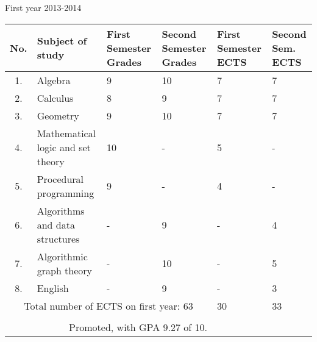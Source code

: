 \documentclass[a4paper,9pt,final]{scrartcl}
\begin{document}
\begin{center}
	First year 2013-2014
	\begin{longtable}{|c|m{6cm}|m{1.5cm}|m{1.5cm}|m{1.5cm}|m{1.5cm}|}
		\hline
		No. & Subject of study & First Semester Grades & Second Semester Grades & First Semester ECTS & Second Sem. ECTS\\
		\hline
		\hline
		1. & Algebra & 9 & 10 & 7 & 7 \\ \hline
		2. & Calculus & 8 & 9 & 7 & 7 \\ \hline
		3. & Geometry & 9 & 10 & 7 & 7 \\ \hline
		4. & Mathematical logic and set theory & 10 & - & 5 & -\\ \hline
		5. & Procedural programming & 9 & - & 4 & - \\ \hline
		6. & Algorithms and data structures & - & 9 & - & 4 \\ \hline
		7. & Algorithmic graph theory & - & 10 & - & 5 \\ \hline 
		8. & English & - & 9 & - & 3 \\ \hline		
		\multicolumn{4}{|c|}{Total number of ECTS on first year: 63} & 30 & 33 \\ \hline 
			\multicolumn{6}{c}{} \\ 
			\multicolumn{4}{r}{Promoted, with GPA 9.27 of 10.}
				
	\end{longtable}

\end{center}
\end{document}

